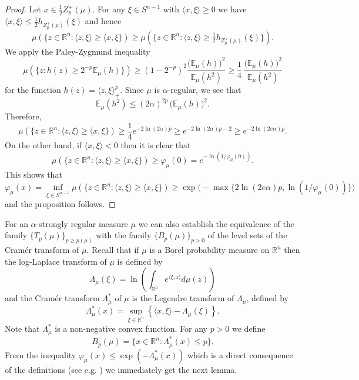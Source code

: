 \documentclass[11pt,leqno]{article}
\theoremstyle{definition}
\theoremstyle{remark}
\numberwithin{equation}{section}
\newcommand{\ls}{\leqslant}
\newcommand{\gr}{\geqslant}
\newcommand{\1}{\textbf{1}}
\begin{document}
\begin{proof}Let $x\in \tfrac{1}{2}Z_p^+(\mu )$. For any $\xi\in S^{n-1}$ with $\langle x,\xi\rangle\gr 0$
we have $\langle x,\xi\rangle\ls \tfrac{1}{2}h_{Z_p^+(\mu )}(\xi )$ and hence
$$\mu (\{z\in {\mathbb R}^n:\langle z,\xi\rangle \gr\langle x,\xi\})\gr\mu(\{z\in {\mathbb R}^n:\langle z,\xi\rangle \gr \tfrac{1}{2} h_{Z_p^+(\mu )}(\xi)\}).$$
We apply the Paley-Zygmund inequality
\begin{equation*}\mu (\{z:h(z)\gr 2^{-p}{\mathbb E}_{\mu }(h)\})\gr
(1-2^{-p})^2\frac{\big({\mathbb E}_{\mu }(h)\big)^2}{{\mathbb E}_{\mu }(h^2)}\gr
\frac{1}{4}\,\frac{\big({\mathbb E}_{\mu }(h)\big)^2}{{\mathbb E}_{\mu }(h^2)}
\end{equation*} for the function $h(z)=\langle z,\xi\rangle_+^p$. Since $\mu$ is $\alpha $-regular, we see that
\begin{equation*}{\mathbb E}_{\mu }(h^2)\ls (2\alpha )^{2p}\,\big({\mathbb E}_{\mu }(h)\big)^2.\end{equation*}
Therefore,
$$\mu (\{z\in {\mathbb R}^n:\langle z,\xi\rangle \gr\langle x,\xi\})\gr
\frac{1}{4}e^{-2\ln (2\alpha )p}\gr e^{-2\ln (2\alpha )p-2}\gr e^{-2\ln(2e\alpha)p}.$$
On the other hand, if $\langle x,\xi\rangle <0$ then it is clear that
$$\mu (\{z\in {\mathbb R}^n:\langle z,\xi\rangle \gr\langle x,\xi\})\gr \varphi_{\mu}(0)= e^{-\ln (1/\varphi_{\mu}(0))}.$$
This shows that
$$\varphi_{\mu}(x)=\inf_{\xi\in S^{n-1}}\mu (\{z\in {\mathbb R}^n:\langle z,\xi\rangle \gr\langle x,\xi\})
\gr \exp\Big(-\max\{2\ln(2e\alpha )p,\ln(1/\varphi_{\mu}(0))\}\Big)$$
and the proposition follows. \end{proof}


For an $\alpha$-strongly regular measure $\mu$ we can also establish the equivalence of the family $\{T_p(\mu)\}_{p\gr p(\mu)}$
with the family $\{B_p(\mu)\}_{p>0}$ of the level sets of the Cram\'{e}r transform of $\mu$.
Recall that if $\mu$ is a Borel probability measure on $\mathbb R^n$ then the log-Laplace transform of $\mu$ is defined by
\begin{equation*}\Lambda_{\mu }(\xi )=\ln\left(\int_{{\mathbb R}^n}e^{\langle\xi
,z\rangle }d\mu(z)\right)\end{equation*}
and the Cram\'{e}r transform $\Lambda_{\mu}^{\ast }$ of $\mu $ is the Legendre transform of $\Lambda_{\mu}$, defined by
\begin{equation*}\Lambda_{\mu }^{\ast }(x)= \sup_{\xi\in {\mathbb R}^n} \left\{ \langle x, \xi\rangle - \Lambda_{\mu }(\xi )\right\}.\end{equation*}
Note that $\Lambda_{\mu}^{\ast}$ is a non-negative convex function. For any $p>0$ we define
$$B_p(\mu)=\{x\in\mathbb{R}^n:\Lambda_{\mu}^{\ast}(x)\ls p\}.$$
From the inequality $\varphi_{\mu } (x)\ls\exp (-\Lambda_{\mu }^{\ast }(x))$ which is a direct
consequence of the definitions (see e.g. \cite[Lemma~3.1]{BGP-threshold}) we immediately get the next
lemma.
\end{document}
